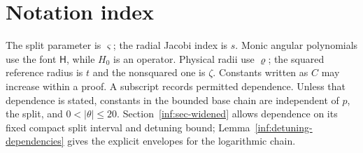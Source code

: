 \section{Notation index}\label{inf:sec-notation}

The split parameter is $\varsigma$; the radial Jacobi index is $s$.
Monic angular polynomials use the font $\mathsf H$, while $H_0$
is an operator. Physical radii use $\varrho$; the squared reference
radius is $t$ and the nonsquared one is $\zeta$.
Constants written as $C$ may increase within a proof. A subscript
records permitted dependence. Unless that dependence is stated,
constants in the bounded base chain are independent of $p$, the split,
and $0<|\theta|\le20$. Section~\ref{inf:sec-widened} allows dependence
on its fixed compact split interval and detuning bound;
Lemma~\ref{inf:detuning-dependencies} gives the explicit envelopes
for the logarithmic chain.


